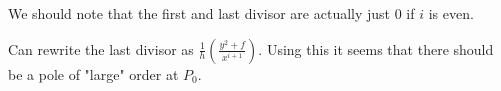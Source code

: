\documentclass[draft, 11pt]{article} %
\theoremstyle{plain}
\theoremstyle{remark}
\begin{document}
We should note that the first and last divisor are actually just 0 if $i$ is even.

Can rewrite the last divisor as $\frac{1}{h}\left(\frac{y^2 + f}{x^{i+1}}\right)$.
Using this it seems that there should be a pole of "large" order at $P_0$.



%

\end{document}
